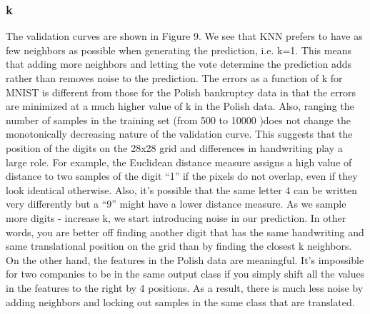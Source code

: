 \documentclass{article}
\begin{document}
\subsubsection*{k}
The validation curves are shown in Figure 9. We see that KNN prefers to have as few neighbors as possible when generating the prediction, i.e. k=1. This means that adding more neighbors and letting the vote determine the prediction adds rather than removes noise to the prediction. The errors as a function of k for MNIST is different from those for the Polish bankruptcy data in that the errors are minimized at a much higher value of k in the Polish data. Also, ranging the number of samples in the training set (from 500 to 10000 )does not change the monotonically decreasing nature of the validation curve. This suggests that the position of the digits on the 28x28 grid and differences in handwriting play a large role. For example, the Euclidean distance measure assigns a high value of distance to two samples of the digit ``1'' if the pixels do not overlap, even if they look identical otherwise. Also, it's possible that the same letter 4 can be written very differently but a ``9'' might have a lower distance measure. As we sample more digits - increase k, we start introducing noise in our prediction. In other words, you are better off finding another digit that has the same handwriting and same translational position on the grid than by finding the closest k neighbors. On the other hand, the features in the Polish data are meaningful. It's impossible for two companies to be in the same output class if you simply shift all the values in the features to the right by 4 positions. As a result, there is much less noise by adding neighbors and locking out samples in the same class that are translated. 
\end{document}
